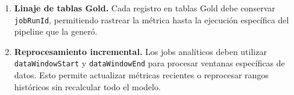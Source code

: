 \begin{enumerate}
  \item \textbf{Linaje de tablas Gold.}
  Cada registro en tablas Gold debe conservar \texttt{jobRunId}, permitiendo rastrear la
  métrica hasta la ejecución específica del pipeline que la generó.

  \item \textbf{Reprocesamiento incremental.}
  Los jobs analíticos deben utilizar \texttt{dataWindowStart} y
  \texttt{dataWindowEnd} para procesar ventanas específicas de datos. Esto permite
  actualizar métricas recientes o reprocesar rangos históricos sin recalcular todo el
  modelo.
\end{enumerate}

\newpage